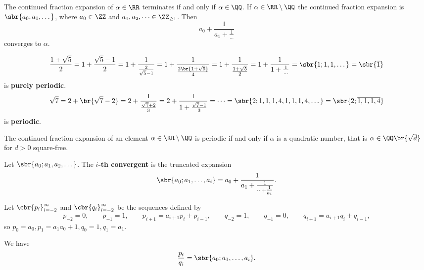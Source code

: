 \pagebreak

\begin{lemma}
The continued fraction expansion of $ \alpha \in \RR $ terminates if and only if $ \alpha \in \QQ $. If $ \alpha \in \RR \setminus \QQ $ the continued fraction expansion is $ \sbr{a_0; a_1, \dots} $, where $ a_0 \in \ZZ $ and $ a_1, a_2, \dots \in \ZZ_{\ge 1} $. Then
$$ a_0 + \dfrac{1}{a_1 + \tfrac{1}{\dots}} $$
converges to $ \alpha $.
\end{lemma}

\begin{example*}
$$ \dfrac{1 + \sqrt{5}}{2} = 1 + \dfrac{\sqrt{5} - 1}{2} = 1 + \dfrac{1}{\tfrac{2}{\sqrt{5} - 1}} = 1 + \dfrac{1}{\tfrac{2\br{1 + \sqrt{5}}}{4}} = 1 + \dfrac{1}{\tfrac{1 + \sqrt{5}}{2}} = 1 + \dfrac{1}{1 + \tfrac{1}{\dots}} = \sbr{1; 1, 1, \dots} = \sbr{\overline{1}} $$
is \textbf{purely periodic}.
$$ \sqrt{7} = 2 + \br{\sqrt{7} - 2} = 2 + \dfrac{1}{\tfrac{\sqrt{7} + 2}{3}} = 2 + \dfrac{1}{1 + \tfrac{\sqrt{7} - 1}{3}} = \dots = \sbr{2; 1, 1, 1, 4, 1, 1, 1, 4, \dots} = \sbr{2; \overline{1, 1, 1, 4}} $$
is \textbf{periodic}.
\end{example*}

\begin{theorem}
The continued fraction expansion of an element $ \alpha \in \RR \setminus \QQ $ is periodic if and only if $ \alpha $ is a quadratic number, that is $ \alpha \in \QQ\br{\sqrt{d}} $ for $ d > 0 $ square-free.
\end{theorem}


\begin{definition}
Let $ \sbr{a_0; a_1, a_2, \dots} $. The \textbf{$ i $-th convergent} is the truncated expansion
$$ \sbr{a_0; a_1, \dots, a_i} = a_0 + \dfrac{1}{a_1 + \tfrac{1}{\dots + \tfrac{1}{a_i}}}. $$
\end{definition}

\begin{definition}
Let $ \cbr{p_i}_{i = -2}^\infty $ and $ \cbr{q_i}_{i = -2}^\infty $ be the sequences defined by
$$ p_{-2} = 0, \qquad p_{-1} = 1, \qquad p_{i + 1} = a_{i + 1}p_i + p_{i - 1}, \qquad q_{-2} = 1, \qquad q_{-1} = 0, \qquad q_{i + 1} = a_{i + 1}q_i + q_{i - 1}, $$
so $ p_0 = a_0, p_1 = a_1a_0 + 1, q_0 = 1, q_1 = a_1 $.
\end{definition}

\begin{lemma}
We have
$$ \dfrac{p_i}{q_i} = \sbr{a_0; a_1, \dots, a_i}. $$
\end{lemma}


